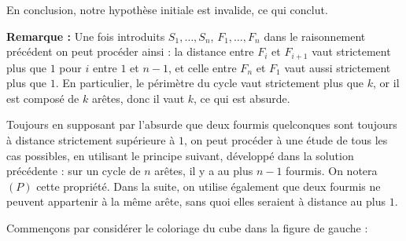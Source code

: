 En conclusion, notre hypothèse initiale est invalide, ce qui conclut.

\textbf{Remarque :} Une fois introduits $S_1,\dots, S_n$, $F_1,\dots, F_n$ dans le raisonnement précédent on peut procéder ainsi : la distance entre $F_i$ et $F_{i+1}$ vaut strictement plus que $1$ pour $i$ entre $1$ et $n-1$, et celle entre $F_n$ et $F_1$ vaut aussi strictement plus que $1$. En particulier, le périmètre du cycle vaut strictement plus que $k$, or il est composé de $k$ arêtes, donc il vaut $k$, ce qui est absurde.


\altsol
Toujours en supposant par l'absurde que deux fourmis quelconques sont toujours à distance strictement supérieure à $1$, on peut procéder à une étude de tous les cas possibles, en utilisant le principe suivant, développé dans la solution précédente : sur un cycle de $n$ arêtes, il y a au plus $n-1$ fourmis. On notera $(P)$ cette propriété. Dans la suite, on utilise également que deux fourmis ne peuvent appartenir à la même arête, sans quoi elles seraient à distance au plus $1$.

\medskip

Commençons par considérer le coloriage du cube dans la figure de gauche :


\begin{center}
\hfill
{}
\end{center}


